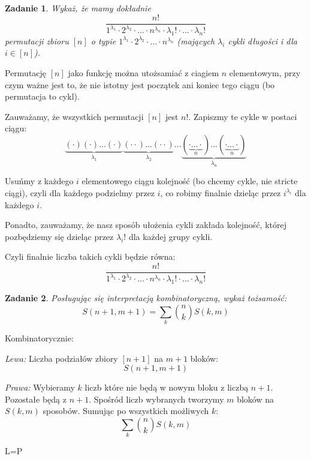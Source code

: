 \documentclass{mwbk}
\newtheorem{zad}{Zadanie}[chapter]
\begin{document}
\begin{zad}
    Wykaż, że mamy dokładnie
    \[\frac{n!}{1^{\lambda_1} \cdot 2^{\lambda_2} \cdot  ... \cdot n^{\lambda_n} \cdot \lambda_1! \cdot ... \cdot \lambda_n!}\]
    permutacji zbioru $[n]$ o typie $1^{\lambda_1} \cdot 2^{\lambda_2} \cdot ... \cdot n^{\lambda_n} $  (mających $\lambda_i$ cykli długości i dla $i \in [n]$).
\end{zad}
\begin{mdframed}
    Permutację $[n]$ jako funkcję można utożsamiać z ciagiem $n$ elementowym,
    przy czym ważne jest to, że nie istotny jest początek ani koniec tego ciągu
    (bo permutacja to cykl).

    Zauważamy, że wszystkich permutacji $[n]$ jest $n!$.
    Zapiszmy te cykle w postaci ciągu:
    \[\underbrace{(\cdot)(\cdot) ... (\cdot)}_{\lambda_1}\underbrace{(\cdot \cdot)...(\cdot \cdot)}_{\lambda_2} ... \underbrace{(\underbrace{\cdot ... \cdot}_{n})...(\underbrace{\cdot ... \cdot}_{n})}_{\lambda_n}\]

    Usuńmy z każdego $i$ elementowego ciągu kolejność
    (bo chcemy cykle, nie stricte ciągi), czyli dla każdego podzielmy przez $i$,
    co robimy finalnie dzieląc przez $i^{\lambda_i}$ dla każdego $i$.

    Ponadto, zauważamy, że nasz sposób ułożenia cykli zakłada kolejność,
    której pozbędziemy się dzieląc przez $\lambda_i!$ dla każdej grupy cykli.

    Czyli finalnie liczba takich cykli będzie równa:
    \[\frac{n!}{1^{\lambda_1} \cdot 2^{\lambda_2} \cdot  ... \cdot n^{\lambda_n} \cdot \lambda_1! \cdot ... \cdot \lambda_n!}\]

\end{mdframed}




\begin{zad}
    Posługując się interpretacją kombinatoryczną, wykaż tożsamość:
    \[S(n+1,m+1) = \sum_k \binom{n}{k}S(k,m)\]
\end{zad}
\begin{mdframed}
    Kombinatorycznie:

    \textit{Lewa:}
    Liczba podziałów zbiory $\left[n+1\right]$ na $m+1$ bloków:
    \[S(n+1,m+1)\]

    \textit{Prawa:}
    Wybieramy $k$ liczb które nie będą w nowym bloku z liczbą $n+1$.
    Pozostałe będą z $n+1$. Spośród liczb wybranych tworzymy $m$ bloków
    na $S(k,m)$ sposobów. Sumując po wszystkich możliwych $k$:
    \[\sum_k \binom{n}{k}S(k,m)\]

    \begin{center}
        L=P
    \end{center}

\end{mdframed}
\end{document}
